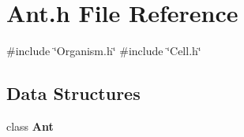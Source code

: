 \section{Ant.\+h File Reference}
\label{Ant_8h}
{\ttfamily \#include \char`\"{}Organism.\+h\char`\"{}}\newline
{\ttfamily \#include \char`\"{}Cell.\+h\char`\"{}}\newline
\subsection*{Data Structures}
\begin{DoxyCompactItemize}
\item 
class \textbf{ Ant}
\end{DoxyCompactItemize}
